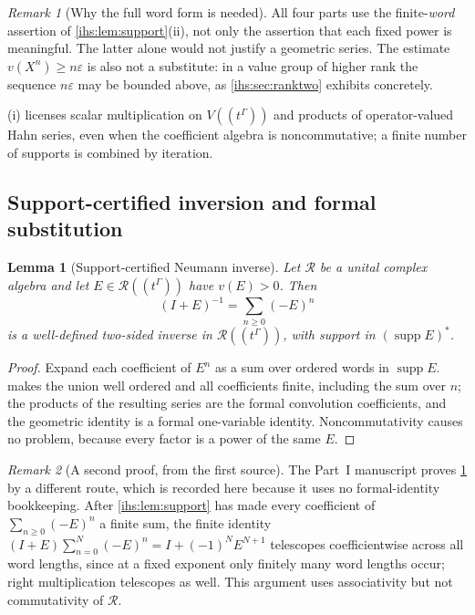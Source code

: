 \documentclass[11pt,a4paper]{article}
\numberwithin{equation}{section}
\newtheorem{lemma}[lemma]{Lemma}
\theoremstyle{definition}
\theoremstyle{remark}
\newtheorem{remark}[remark]{Remark}
\newcommand{\supp}{\operatorname{supp}}
\newcommand{\eps}{\varepsilon}
\begin{document}
\begin{remark}[Why the full word form is needed]\label{ihs:rem:wordform}
All four parts use the finite-\emph{word} assertion of
\cref{ihs:lem:support}(ii), not only the assertion that each fixed power is
meaningful. The latter alone would not justify a geometric series. The
estimate $v(X^n)\ge n\eps$ is also not a substitute: in a value group of
higher rank the sequence $n\eps$ may be bounded above, as
\cref{ihs:sec:ranktwo} exhibits concretely.
\end{remark}

(i) licenses scalar multiplication on $V((t^\Gamma))$
and products of operator-valued Hahn series, even when the coefficient
algebra is noncommutative; a finite number of supports is combined by
iteration.

\subsection{Support-certified inversion and formal substitution}\label{ihs:sec:neumann}
\begin{lemma}[Support-certified Neumann inverse]\label{ihs:lem:neumann}
Let $\mathscr R$ be a unital complex algebra and let
$E\in\mathscr R((t^\Gamma))$ have $v(E)>0$. Then
\begin{equation}\label{ihs:eq:neumann}
 (I+E)^{-1}=\sum_{n\ge0}(-E)^n
\end{equation}
is a well-defined two-sided inverse in $\mathscr R((t^\Gamma))$, with
support in $(\supp E)^*$.
\end{lemma}
\begin{proof}
Expand each coefficient of $E^n$ as a sum over ordered words in $\supp E$.
 makes the union well ordered and all coefficients
finite, including the sum over $n$; the products of the resulting series are
the formal convolution coefficients, and the geometric identity is a formal
one-variable identity. Noncommutativity causes no problem, because every
factor is a power of the same $E$.
\end{proof}

\begin{remark}[A second proof, from the first source]\label{ihs:rem:telescope}
The Part~I manuscript proves \cref{ihs:lem:neumann} by a different route,
which is recorded here because it uses no formal-identity bookkeeping. After
\cref{ihs:lem:support} has made every coefficient of $\sum_{n\ge0}(-E)^n$ a
finite sum, the finite identity
$(I+E)\sum_{n=0}^{N}(-E)^n=I+(-1)^N E^{N+1}$ telescopes coefficientwise
across all word lengths, since at a fixed exponent only finitely many word
lengths occur; right multiplication telescopes as well. This argument uses
associativity but not commutativity of $\mathscr R$.
\end{remark}
\end{document}
